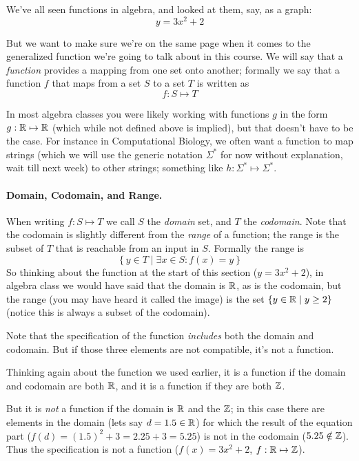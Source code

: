 We've all seen functions in algebra, and looked at them, say, as a graph:
\[
y = 3x^2 + 2
\]

But we want to make sure we're on the same page when it comes to the generalized function we're going to talk about in this course. 
We will say that a \emph{function} provides a mapping from one set onto another; 
formally we say that a function $f$ that maps from a set $S$ to a set $T$ is written as 
\[
f: S \mapsto T
\]

In most algebra classes you were likely working with functions $g$ in the form $g: \operatorname{\mathbb{R}} \mapsto\operatorname{\mathbb{R}}$ (which while not defined above is implied), 
but that doesn't have to be the case. 
For instance in Computational Biology, we often want a function to map strings 
(which we will use the generic notation $\Sigma^*$ for now without explanation, wait till next week)
to other strings; 
something like $h: \Sigma^* \mapsto \Sigma^*$. 

\paragraph{Domain, Codomain, and Range.}
When writing $f: S \mapsto T$ we call $S$ the \emph{domain} set, and $T$ the \emph{codomain}. 
Note that the codomain is slightly different from the \emph{range} of a function; 
the range is the subset of $T$ that is reachable from an input in $S$. 
Formally the range is 
\[
\left\{y \in T \mid \exists x \in S : f(x) = y\right\}
\]
So thinking about the function at the start of this section ($y = 3x^2 + 2$), 
in algebra class we would have said that the domain is $\operatorname{\mathbb{R}}$, as is the codomain, but the range (you may have heard it called the image) 
is the set $\left\{y \in \operatorname{\mathbb{R}} \mid y \ge 2\right\}$ (notice this is always a subset of the codomain). 

\begin{tcolorbox}[colback=blue!5,colframe=blue!75!black,title=Extra details]
Note that the specification of the function \textit{includes} both the domain and codomain. 
But if those three elements are not compatible, it's not a function. 
\vspace{1em}

Thinking again about the function we used earlier, it is a function if the domain and codomain are both $\operatorname{\mathbb{R}}$, 
and it is a function if they are both $\operatorname{\mathbb{Z}}$. 
\vspace{1em}

But it is \emph{not} a function if the domain is $\operatorname{\mathbb{R}}$ and the $\operatorname{\mathbb{Z}}$; 
in this case there are elements in the domain (lets say $d=1.5\in\operatorname{\mathbb{R}}$) 
for which the result of the equation part ($f(d)=(1.5)^2+3=2.25+3=5.25$)
is not in the codomain ($5.25\notin\operatorname{\mathbb{Z}}$).    
Thus the specification is not a function ($f(x) = 3x^2 + 2$, $f: \operatorname{\mathbb{R}}\mapsto\operatorname{\mathbb{Z}}$).
\end{tcolorbox}

